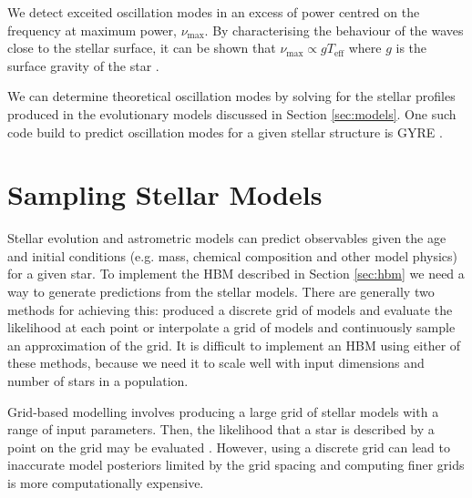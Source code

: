 
We detect exceited oscillation modes in an excess of power centred on the frequency at maximum power, $\nu_\mathrm{max}$. By characterising the behaviour of the waves close to the stellar surface, it can be shown that $\nu_\mathrm{max} \propto g T_\mathrm{eff}$ where $g$ is the surface gravity of the star \citep{Kjeldsen.Bedding1995}.

We can determine theoretical oscillation modes by solving for the stellar profiles produced in the evolutionary models discussed in Section \ref{sec:models}. One such code build to predict oscillation modes for a given stellar structure is GYRE \citep{Townsend.Teitler2013}. 

\section{Sampling Stellar Models}\label{sec:sample}

Stellar evolution and astrometric models can predict observables given the age and initial conditions (e.g. mass, chemical composition and other model physics) for a given star. To implement the HBM described in Section \ref{sec:hbm} we need a way to generate predictions from the stellar models. There are generally two methods for achieving this: produced a discrete grid of models and evaluate the likelihood at each point or interpolate a grid of models and continuously sample an approximation of the grid. It is difficult to implement an HBM using either of these methods, because we need it to scale well with input dimensions and number of stars in a population.

Grid-based modelling involves producing a large grid of stellar models with a range of input parameters. Then, the likelihood that a star is described by a point on the grid may be evaluated \citep[see e.g. BASTA][]{SilvaAguirre.Davies.ea2015}. However, using a discrete grid can lead to inaccurate model posteriors limited by the grid spacing and computing finer grids is more computationally expensive.


